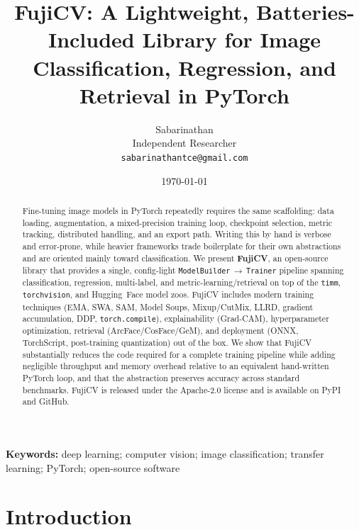 \documentclass[11pt]{article}
\title{FujiCV: A Lightweight, Batteries-Included Library for Image
Classification, Regression, and Retrieval in PyTorch}
\author{Sabarinathan\\
\small Independent Researcher \\
\small \texttt{sabarinathantce@gmail.com}}
\date{\today}
\begin{document}
\maketitle

\begin{abstract}
Fine-tuning image models in PyTorch repeatedly requires the same scaffolding:
data loading, augmentation, a mixed-precision training loop, checkpoint
selection, metric tracking, distributed handling, and an export path. Writing
this by hand is verbose and error-prone, while heavier frameworks trade
boilerplate for their own abstractions and are oriented mainly toward
classification. We present \textbf{FujiCV}, an open-source library that provides
a single, config-light \texttt{ModelBuilder}\,$\rightarrow$\,\texttt{Trainer}
pipeline spanning classification, regression, multi-label, and
metric-learning/retrieval on top of the \texttt{timm}, \texttt{torchvision}, and
Hugging~Face model zoos. FujiCV includes modern training techniques (EMA, SWA,
SAM, Model Soups, Mixup/CutMix, LLRD, gradient accumulation, DDP,
\texttt{torch.compile}), explainability (Grad-CAM), hyperparameter optimization,
retrieval (ArcFace/CosFace/GeM), and deployment (ONNX, TorchScript, post-training
quantization) out of the box. We show that FujiCV substantially reduces the code
required for a complete training pipeline while adding negligible throughput and
memory overhead relative to an equivalent hand-written PyTorch loop, and that the
abstraction preserves accuracy across standard benchmarks. FujiCV is released
under the Apache-2.0 license and is available on PyPI and GitHub.
\end{abstract}

\textbf{Keywords:} deep learning; computer vision; image classification; transfer
learning; PyTorch; open-source software

\section{Introduction}
\label{sec:intro}
\end{document}
